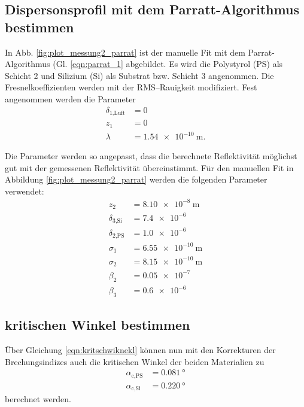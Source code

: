 \subsection{Dispersonsprofil mit dem Parratt-Algorithmus bestimmen} %

In Abb. \ref{fig:plot_messung2_parrat} ist der manuelle Fit mit dem
Parrat-Algorithmus (Gl. \eqref{eqn:parrat_1} abgebildet.
Es wird die Polystyrol (PS) als Schicht 2 und Silizium
(Si) als Substrat bzw. Schicht 3 angenommen.
Die Fresnelkoeffizienten werden mit der RMS–Rauigkeit modifiziert.
Fest angenommen werden die Parameter
 \begin{align*}
  \delta_\text{1,Luft} &= 0 \\
  z_1 &= 0 \\
  \lambda &= \SI{1.54e-10}{\meter}.
\end{align*}

Die Parameter werden so angepasst, dass die berechnete Reflektivität möglichst 
gut mit der gemessenen Reflektivität übereinstimmt.
Für den manuellen Fit in Abbildung \ref{fig:plot_messung2_parrat} werden die folgenden 
Parameter verwendet:
\begin{align*}
  z_2 &= \SI{8.10e-8}{\meter}\\
  \delta_\text{3,Si} &= \num{7.4e-6}\\
  \delta_\text{2,PS} &= \num{1.0e-6}\\
  \sigma_1 &= \SI{6.55e-10}{\meter} \\
  \sigma_2 &= \SI{8.15e-10}{\meter} \\
  \beta_2 &= \num{0.05e-7}\\
  \beta_3 &= \num{0.6e-6}
\end{align*}


\subsection{kritischen Winkel bestimmen}
Über Gleichung \eqref{eqn:kritschwiknekl} können nun mit den Korrekturen der Brechungsindizes auch die kritischen Winkel der beiden Materialien zu 
\begin{align*}
    \alpha_\text{c,PS} &= \SI{0.081}{\degree} \\
    \alpha_\text{c,Si} &= \SI{0.220}{\degree}
\end{align*}
berechnet werden.




